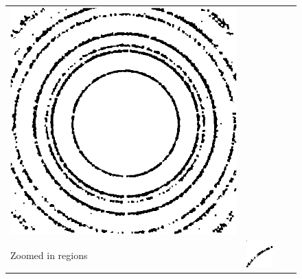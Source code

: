 \documentclass[preprint]{iucr}              %
\begin{document}
\begin{figure}
\begin{tabular}{>{\centering\arraybackslash}m{.1\linewidth}>{\centering\arraybackslash}m{.25\linewidth}>{\centering\arraybackslash}m{.25\linewidth}>{\centering\arraybackslash}m{.25\linewidth}}
\includegraphics[width=\linewidth]{Detail/ThinnedFull.png}
\\
Zoomed in regions&
\includegraphics[width=\linewidth]{Detail/NorSmooth.png}&

\end{tabular}
\end{figure}
\end{document}
